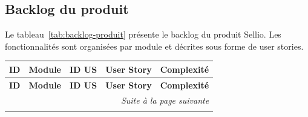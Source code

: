 \subsection{Backlog du produit}
Le tableau~\ref{tab:backlog-produit} présente le backlog du produit Sellio. Les fonctionnalités sont organisées par module et décrites sous forme de user stories.
\small
\begin{longtable}{|p{0.9cm}|p{3cm}|p{1.3cm}|p{6.6cm}|p{1.9cm}|}
\hline
\textbf{ID} & \textbf{Module} & \textbf{ID US} & \textbf{User Story} & \textbf{Complexité} \\
\hline
\endfirsthead
\hline
\textbf{ID} & \textbf{Module} & \textbf{ID US} & \textbf{User Story} & \textbf{Complexité} \\
\hline
\endhead
\hline \multicolumn{5}{r}{\textit{Suite à la page suivante}} \\
\endfoot
\hline
\endlastfoot


\end{longtable}
